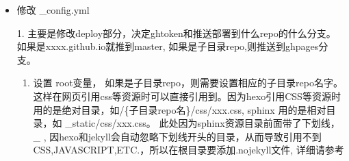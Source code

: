 \documentclass[letterpaper,12pt,english]{sphinxmanual}
\begin{document}
\begin{enumerate}
\begin{itemize}
hexo deploy法，用sed修改hexo \_config.yml 中的deploy命令

注意，如果源码是在分支上要修改branches为相应的分支名，缺省是master:

\begin{sphinxVerbatim}[commandchars=\\\{\}]
\PYGZsh{}\PYGZsh{}\PYGZsh{} for branch of hexo\PYGZhy{}next\PYGZhy{}muse

\PYGZsh{} 指定语言环境
language: node\PYGZus{}js
\PYGZsh{} 指定需要sudo权限
sudo: required
\PYGZsh{} 指定node\PYGZus{}js版本
node\PYGZus{}js:
  \PYGZhy{} 10.16.3
\PYGZsh{} 指定缓存模块，可选。缓存可加快编译速度。
cache:
  directories:
    \PYGZhy{} node\PYGZus{}modules

\PYGZsh{} 指定博客源码分支，因人而异。hexo博客源码托管在独立repo则不用设置此项
branches:
  only:
    \PYGZhy{} hexo\PYGZhy{}next\PYGZhy{}muse

before\PYGZus{}install:
  \PYGZhy{} npm install \PYGZhy{}g hexo\PYGZhy{}cli

\PYGZsh{} Start: Build Lifecycle
install:
  \PYGZhy{} npm install
  \PYGZhy{} npm install hexo\PYGZhy{}deployer\PYGZhy{}git \PYGZhy{}\PYGZhy{}save

\PYGZsh{} 执行清缓存，生成网页操作
script:
  \PYGZhy{} hexo clean
  \PYGZhy{} hexo generate

\PYGZsh{} 设置git提交名，邮箱；替换真实token到\PYGZus{}config.yml文件，最后depoy部署
after\PYGZus{}script:
  \PYGZhy{} git config user.name \PYGZdq{}kevinluolog\PYGZdq{}
  \PYGZhy{} git config user.email \PYGZdq{}kevinluolog\PYGZus{}72@163.com\PYGZdq{}
  \PYGZsh{} 替换同目录下的\PYGZus{}config.yml文件中gh\PYGZus{}token字符串为travis后台刚才配置的变量，注意此处sed命令用了双引号。单引号无效！
  \PYGZhy{} sed \PYGZhy{}i \PYGZdq{}s/gh\PYGZus{}token/\PYGZdl{}\PYGZob{}GH\PYGZus{}TOKEN\PYGZcb{}/g\PYGZdq{} ./\PYGZus{}config.yml
  \PYGZhy{} hexo deploy
\PYGZsh{} End: Build LifeCycle

\PYGZus{}config.yml中的代码如下：
deploy:
type: git
repo: https://gh\PYGZus{}token@github.com/kevinluolog/        kevinluolog.github.io.git
branch: master
\end{sphinxVerbatim}

\item {} 
修改 \_config.yml

1. 主要是修改deploy部分，决定gh\sphinxhyphen{}token和推送部署到什么repo的什么分支。
如果是xxxx.github.io就推到master, 如果是子目录repo,则推送到gh\sphinxhyphen{}pages分支。
\begin{enumerate}
%
\setcounter{enumii}{1}
\item {} 
设置 root变量， 如果是子目录repo，则需要设置相应的子目录repo名字。这样在网页引用css等资源时可以直接引用到。因为hexo引用CSS等资源时用的是绝对目录，如/\{子目录repo名\}/css/xxx.css, sphinx 用的是相对目录，如 \_static/css/xxx.css。 此处因为sphinx资源目录前面带了下划线， \_ , 因hexo和jekyll会自动忽略下划线开头的目录，从而导致引用不到CSS,JAVASCRIPT,ETC.，所以在根目录要添加.nojekyll文件, 详细请参考 {\hyperref[\detokenize{001software/001install/001._u7f51_u7ad9/hexo:githubpages}]{}}


\end{enumerate}
\end{itemize}
\end{enumerate}
\end{document}
